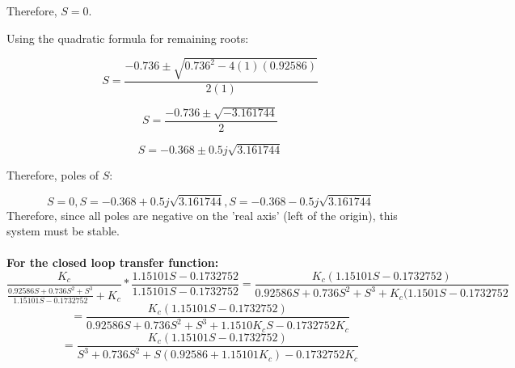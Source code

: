 \documentclass{article}
\numberwithin{equation}{section}
\begin{document}
Therefore, \(S = 0\).

Using the quadratic formula for remaining roots:

\begin{equation}
S = \frac{-0.736 \pm \sqrt{0.736^2 - 4(1)(0.92586)}}{2(1)}
\end{equation}

\begin{equation}
S = \frac{-0.736 \pm \sqrt{-3.161744}}{2}
\end{equation}

\begin{equation}
S = -0.368 \pm 0.5j \sqrt{3.161744}
\end{equation}

Therefore, poles of \(S\):

\begin{equation}
S = 0, S= -0.368 + 0.5j \sqrt{3.161744}, S = -0.368 - 0.5j \sqrt{3.161744}
\end{equation}
Therefore, since all poles are negative on the 'real axis' (left of the origin), this system must be stable.\\\\
\textbf{For the closed loop transfer function:}
\begin{equation}
    \frac{K_c}{\frac{0.92586S + 0.736S^2 + S^3}{1.15101S - 0.1732752} + K_c} * \frac{1.15101S - 0.1732752}{1.15101S - 0.1732752}
    = \frac{K_c (1.15101S - 0.1732752)}{0.92586S + 0.736S^2 + S^3 + K_c(1.1501S - 0.1732752}
\end{equation}
\begin{equation}
    = \frac{K_c (1.15101S - 0.1732752)}{0.92586S + 0.736S^2 + S^3 + 1.1510K_c S - 0.1732752K_c}
\end{equation}
\begin{equation}
     = \frac{K_c (1.15101S - 0.1732752)}{S^3 + 0.736S^2 + S(0.92586+1.15101K_c) - 0.1732752K_c}
\end{equation}

\newpage
\end{document}
